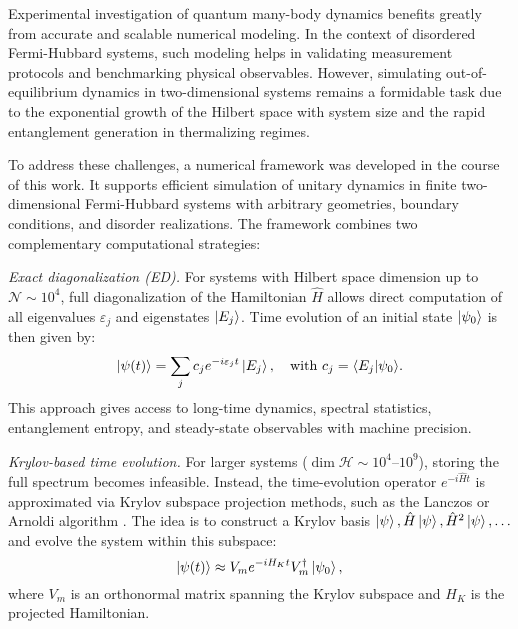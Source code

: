 

Experimental investigation of quantum many-body dynamics benefits greatly from accurate and scalable numerical modeling. In the context of disordered Fermi-Hubbard systems, such modeling helps in validating measurement protocols and benchmarking physical observables. However, simulating out-of-equilibrium dynamics in two-dimensional systems remains a formidable task due to the exponential growth of the Hilbert space with system size and the rapid entanglement generation in thermalizing regimes.

To address these challenges, a numerical framework was developed in the course of this work. It supports efficient simulation of unitary dynamics in finite two-dimensional Fermi-Hubbard systems with arbitrary geometries, boundary conditions, and disorder realizations. The framework combines two complementary computational strategies:

\textit{Exact diagonalization (ED).}
For systems with Hilbert space dimension up to $\mathcal{N} \sim 10^4$, full diagonalization of the Hamiltonian $\hat{H}$ allows direct computation of all eigenvalues ${\varepsilon_j}$ and eigenstates ${\left| E_j \right\rangle}$. Time evolution of an initial state $\left| \psi_0 \right\rangle$ is then given by:
\begin{equation}
\ket{\psi(t)} = \sum_j c_j e^{-i \varepsilon_j t} \ket{E_j}, \quad \text{with } c_j = \bk{E_j}{\psi_0}.
\end{equation}
This approach gives access to long-time dynamics, spectral statistics, entanglement entropy, and steady-state observables with machine precision. 

\textit{Krylov-based time evolution.}
For larger systems ($\dim \mathcal{H} \sim 10^4$–$10^9$), storing the full spectrum becomes infeasible. Instead, the time-evolution operator $e^{-i \hat{H} t}$ is approximated via Krylov subspace projection methods, such as the Lanczos or Arnoldi algorithm \cite{saad_analysis_1992,hochbruck_krylov_1997}. The idea is to construct a Krylov basis ${ \left| \psi \right\rangle, \hat{H} \left| \psi \right\rangle, \hat{H}^2 \left| \psi \right\rangle, \ldots }$ and evolve the system within this subspace:
\begin{equation}
\left| \psi(t) \right\rangle \approx V_m e^{-i H_K t} V_m^\dagger \left| \psi_0 \right\rangle,
\end{equation}
where $V_m$ is an orthonormal matrix spanning the Krylov subspace and $H_K$ is the projected Hamiltonian. 


